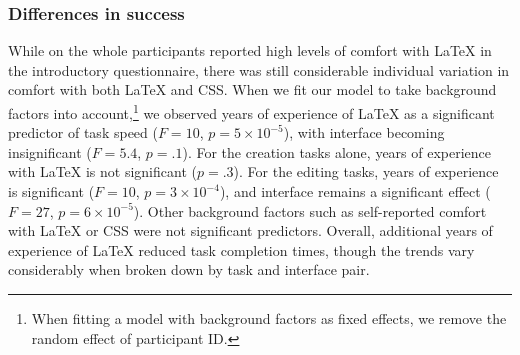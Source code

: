 
\subsubsection{Differences in success}


While on the whole participants reported high levels of comfort with LaTeX in the introductory questionnaire, there was still considerable individual variation in comfort with both LaTeX and CSS. When we fit our model to take background factors into account,\footnote{When fitting a model with background factors as fixed effects, we remove the random effect of participant ID.} we observed years of experience of LaTeX as a significant predictor of task speed ($F=10$, $p=5\times10^{-5}$), with interface becoming insignificant ($F=5.4$, $p=.1$). For the creation tasks alone, years of experience with LaTeX is not significant  ($p=.3$). For the editing tasks, years of experience is significant ($F=10$, $p=3\times10^{-4}$), and interface remains a significant effect ($F=27$, $p=6\times10^{-5}$). Other background factors such as self-reported comfort with LaTeX or CSS were not significant predictors. Overall, additional years of experience of LaTeX reduced task completion times, though the trends vary considerably when broken down by task and interface pair.

